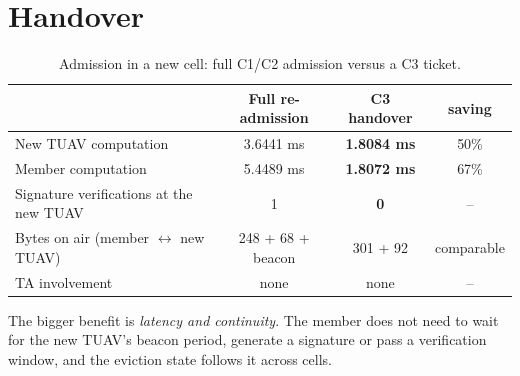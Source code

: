 \section{Handover}
\begin{table}[H]
\centering\small
\caption{Admission in a new cell: full C1/C2 admission versus a C3 ticket.}
\label{tab:ho}
\begin{tabular}{@{}lccc@{}}
\toprule
 & Full re-admission & \textbf{C3 handover} & saving\\
\midrule
New TUAV computation & 3.6441 ms & \textbf{1.8084 ms} & 50\%\\
Member computation & 5.4489 ms & \textbf{1.8072 ms} & 67\%\\
Signature verifications at the new TUAV & 1 & \textbf{0} & --\\
Bytes on air (member $\leftrightarrow$ new TUAV) & 248 + 68 + beacon & 301 + 92 & comparable\\
TA involvement & none & none & --\\
\bottomrule
\end{tabular}
\end{table}
\noindent The bigger benefit is \emph{latency and continuity}. The member does not need to wait for the new TUAV's beacon period, generate a signature or pass a
verification window, and the eviction state follows it across cells.
